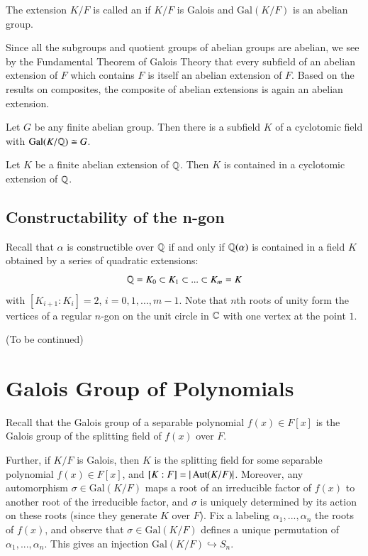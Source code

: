 \documentclass[12pt, a4paper, oneside, openright, titlepage]{book}
\begin{document}
\begin{defn}
    The extension $K/F$ is called an  if $K/F$ is Galois and $\text{Gal}(K/F)$ is an abelian group.
\end{defn}

Since all the subgroups and quotient groups of abelian groups are abelian, we see by the Fundamental Theorem of Galois Theory that every subfield of an abelian extension of $F$ which contains $F$ is itself an abelian extension of $F$. Based on the results on composites, the composite of abelian extensions is again an abelian extension. 

\begin{cor}
    Let $G$ be any finite abelian group. Then there is a subfield $K$ of a cyclotomic field with $\text{Gal}(K/\mathbb Q)\cong G$.
\end{cor}


\begin{thm}
    Let $K$ be a finite abelian extension of $\mathbb Q$. Then $K$ is contained in a cyclotomic extension of $\mathbb Q$.
\end{thm}

\subsection{Constructability of the n-gon}

Recall that $\alpha$ is constructible over $\mathbb Q$ if and only if $\mathbb Q(\alpha)$ is contained in a field $K$ obtained by a series of quadratic extensions: \begin{equation*}
    \mathbb Q = K_0\subset K_1 \subset ... \subset K_m = K
\end{equation*}
with $[K_{i+1}:K_i] = 2$, $i = 0,1,...,m-1$. Note that $n$th roots of unity form the vertices of a regular $n$-gon on the unit circle in $\mathbb C$ with one vertex at the point $1$.

(To be continued)



\section{\textsection Galois Group of Polynomials}

Recall that the Galois group of a separable polynomial $f(x) \in F[x]$ is the Galois group of the splitting field of $f(x)$ over $F$. 

Further, if $K/F$ is Galois, then $K$ is the splitting field for some separable polynomial $f(x) \in F[x]$, and $[K:F] = |\operatorname{Aut}(K/F)|$. Moreover, any automorphism $\sigma \in \text{Gal}(K/F)$ maps a root of an irreducible factor of $f(x)$ to another root of the irreducible factor, and $\sigma$ is uniquely determined by its action on these roots (since they generate $K$ over $F$). Fix a labeling $\alpha_1,...,\alpha_n$ the roots of $f(x)$, and observe that $\sigma \in \text{Gal}(K/F)$ defines a unique permutation of $\alpha_1,...,\alpha_n$. This gives an injection $\text{Gal}(K/F) \hookrightarrow S_n$. 
\end{document}
